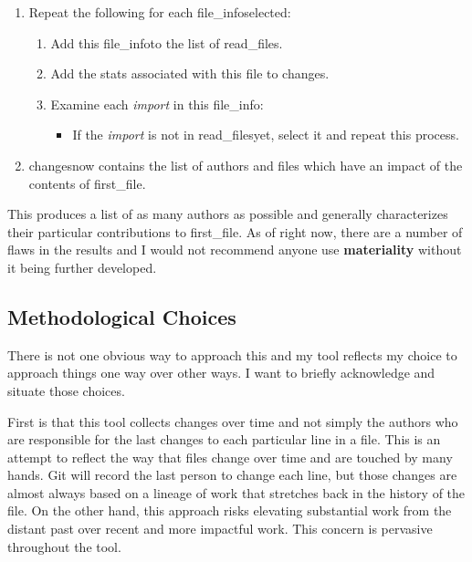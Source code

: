 \documentclass[a4paper,man,natbib,floatsintext]{apa6}
\begin{document}
\begin{enumerate}
    \item Repeat the following for each \textlangle file\_info\textrangle selected:
    \begin{enumerate}
      \item Add this \textlangle file\_info\textrangle to the list of \textlangle read\_files\textrangle.
      \item Add the stats associated with this file to \textlangle changes\textrangle.
      \item Examine each \textit{import} in this \textlangle file\_info\textrangle:
      \begin{itemize}
        \item If the \textit{import} is not in \textlangle read\_files\textrangle yet, select it and repeat this process.
      \end{itemize}
    \end{enumerate}
    \item \textlangle changes\textrangle now contains the list of authors and files which have an impact of the contents of \textlangle first\_file\textrangle.
  \end{enumerate}
  \doublespace

  This produces a list of as many authors as possible and generally characterizes their particular contributions to \textlangle first\_file\textrangle. As of right now, there are a number of flaws in the results and I would not recommend anyone use \textbf{materiality} without it being further developed\footnotemark. 


  \subsection{Methodological Choices}
  There is not one obvious way to approach this and my tool reflects my choice to approach things one way over other ways. I want to briefly acknowledge and situate those choices.

  First is that this tool collects changes over time and not simply the authors who are responsible for the last changes to each particular line in a file. This is an attempt to reflect the way that files change over time and are touched by many hands. Git will record the last person to change each line, but those changes are almost always based on a lineage of work that stretches back in the history of the file. On the other hand, this approach risks elevating substantial work from the distant past over recent and more impactful work. This concern is pervasive throughout the tool.
\end{document}
